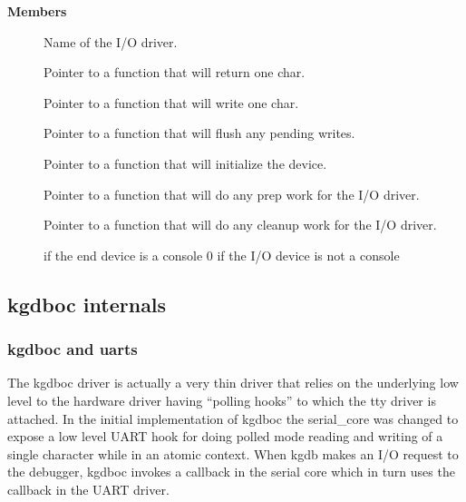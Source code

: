 \documentclass[a4paper,8pt,english]{sphinxmanual}
\begin{document}
\textbf{Members}
\begin{description}
\item[{}] \leavevmode
Name of the I/O driver.

\item[{}] \leavevmode
Pointer to a function that will return one char.

\item[{}] \leavevmode
Pointer to a function that will write one char.

\item[{}] \leavevmode
Pointer to a function that will flush any pending writes.

\item[{}] \leavevmode
Pointer to a function that will initialize the device.

\item[{}] \leavevmode
Pointer to a function that will do any prep work for
the I/O driver.

\item[{}] \leavevmode
Pointer to a function that will do any cleanup work
for the I/O driver.

\item[{}]  if the end device is a console 0 if the I/O device is
not a console

\end{description}


\subsection{kgdboc internals}
\label{dev-tools/kgdb:kgdboc-internals}

\subsubsection{kgdboc and uarts}
\label{dev-tools/kgdb:kgdboc-and-uarts}
The kgdboc driver is actually a very thin driver that relies on the
underlying low level to the hardware driver having ``polling hooks'' to
which the tty driver is attached. In the initial implementation of
kgdboc the serial\_core was changed to expose a low level UART hook for
doing polled mode reading and writing of a single character while in an
atomic context. When kgdb makes an I/O request to the debugger, kgdboc
invokes a callback in the serial core which in turn uses the callback in
the UART driver.
\end{document}
